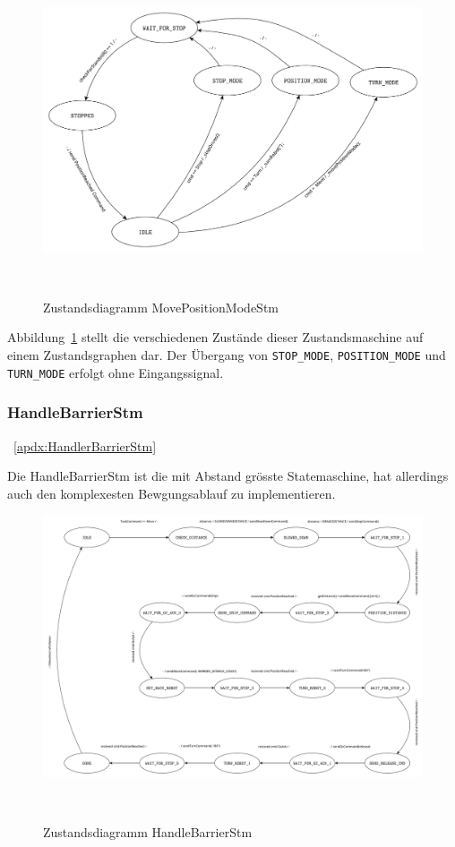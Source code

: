 \documentclass[main.tex]{subfiles} %
\begin{document}
\begin{figure}[H]
    \centering
    \includegraphics[width=0.75\linewidth]{./fig_Firmware_MotionController/MovePositionModeStm.pdf}
    \caption{Zustandsdiagramm MovePositionModeStm}~\label{fig:MovePositionModeStm}
\end{figure}

Abbildung~\ref{fig:MovePositionModeStm} stellt die verschiedenen Zustände
dieser Zustandsmaschine auf einem Zustandsgraphen dar. Der Übergang von
\texttt{STOP\_MODE}, \texttt{POSITION\_MODE} und \texttt{TURN\_MODE} erfolgt
ohne Eingangssignal.

\subsubsection*{HandleBarrierStm}~\ref{apdx:HandlerBarrierStm}

Die HandleBarrierStm ist die mit Abstand grösste Statemaschine, hat allerdings
auch den komplexesten Bewgungsablauf zu implementieren.

\begin{figure}[H]
    \centering
    \includegraphics[width=1\linewidth]{./fig_Firmware_MotionController/HandleBarrierStm.pdf}
    \caption{Zustandsdiagramm HandleBarrierStm}~\label{fig:HandleBarrierStm}
\end{figure}
\end{document}
